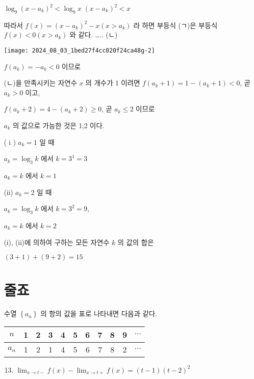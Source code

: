 \documentclass[10pt]{article}
\begin{document}
\(\log _{9}\left(x-a_{k}\right)^{2}<\log _{9} x\) \(\left(x-a_{k}\right)^{2}<x\)

따라서 \(f(x)=\left(x-a_{k}\right)^{2}-x\left(x>a_{k}\right)\) 라 하면 부등식 (ㄱ)은 부등식 \(f(x)<0\left(x>a_{k}\right)\) 와 같다. ….. (ㄴ)

\begin{center}
\texttt{[image: 2024\_08\_03\_1bed27f4cc020f24ca48g-2]}
\end{center}

\(f\left(a_{k}\right)=-a_{k}<0\) 이므로

(ㄴ)을 만족시키는 자연수 \(x\) 의 개수가 1 이려면 \(f\left(a_{k}+1\right)=1-\left(a_{k}+1\right)<0\), 곧 \(a_{k}>0\) 이고,

\(f\left(a_{k}+2\right)=4-\left(a_{k}+2\right) \geq 0\), 곧 \(a_{k} \leq 2\) 이므로

\(a_{k}\) 의 값으로 가능한 것은 1,2 이다.

( i ) \(a_{k}=1\) 일 때

\(a_{k}=\log _{3} k\) 에서 \(k=3^{1}=3\)

\(a_{k}=k\) 에서 \(k=1\)

(ii) \(a_{k}=2\) 일 때

\(a_{k}=\log _{3} k\) 에서 \(k=3^{2}=9\),

\(a_{k}=k\) 에서 \(k=2\)

(i), (ii)에 의하여 구하는 모든 자연수 \(k\) 의 값의 합은

\((3+1)+(9+2)=15\)

\section*{줄죠}
수열 \(\left\{a_{n}\right\}\) 의 항의 값을 표로 나타내면 다음과 같다.

\begin{center}
\begin{tabular}{|c|c|c|c|c|c|c|c|c|c|c|}
\hline
\(n\) & 1 & 2 & 3 & 4 & 5 & 6 & 7 & 8 & 9 & \(\cdots\) \\
\hline
\(a_{n}\) & 1 & 2 & 1 & 4 & 5 & 6 & 7 & 8 & 2 & \(\cdots\) \\
\hline
\end{tabular}
\end{center}

\begin{enumerate}
  \setcounter{enumi}{12}
  \item \(\lim _{x \rightarrow t-} f(x)-\lim _{x \rightarrow t+} f(x)=(t-1)(t-2)^{2}\)
\end{enumerate}
\end{document}
